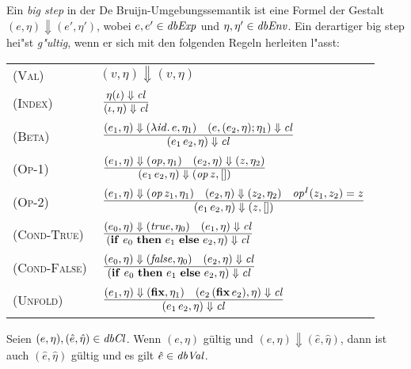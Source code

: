 \documentclass[12pt,fleqn]{article}
\newcommand{\RN}[1]{\mbox{\textsc{(#1)}}}
\newcommand{\cl}{\name{cl}}
\begin{document}
\begin{definition}
Ein {\em big step} in der De Bruijn-Umgebungssemantik ist eine Formel der Gestalt $(e,\eta) \Downarrow (e',\eta')$,
wobei $e,e'\in{\text{\it dbExp\/}}$ und $\eta,\eta'\in{\text{\it dbEnv\/}}$. Ein derartiger big step hei"st {\em g"ultig}, wenn er sich mit den
folgenden Regeln herleiten l"asst: \\[5mm]
\begin{tabular}{ll}
  \RN{Val}        & $(v,\eta) \Downarrow (v,\eta)$ \\[3mm]
  \RN{Index}      & $\regel{\eta(\iota) \Downarrow \cl}
                           {(\iota,\eta) \Downarrow \cl}$ \\[3mm]
  \RN{Beta}       & $\regel{(e_1,\eta) \Downarrow (\abstr{\id}{e},\eta_1)
                            \quad (e,(e_2,\eta);\eta_1) \Downarrow \cl}
                           {(\app{e_1}{e_2},\eta) \Downarrow \cl}$ \\[3mm]
  \RN{Op-1}       & $\regel{(e_1,\eta) \Downarrow (\op,\eta_1) \quad (e_2,\eta) \Downarrow (z,\eta_2)}
                           {(\app{e_1}{e_2},\eta) \Downarrow (\app{\op}{z},[])}$ \\[3mm]
  \RN{Op-2}       & $\regel{(e_1,\eta) \Downarrow (\app{\op}{z_1},\eta_1)
                            \quad (e_2,\eta) \Downarrow (z_2,\eta_2)
                            \quad \op^I(z_1,z_2) = z}
                           {(\app{e_1}{e_2},\eta) \Downarrow (z,[])}$ \\[3mm]
  \RN{Cond-True}  & $\regel{(e_0,\eta) \Downarrow (\true,\eta_0) \quad (e_1,\eta) \Downarrow \cl}
                           {(\bifte{e_0}{e_1}{e_2},\eta) \Downarrow \cl}$ \\[3mm]
  \RN{Cond-False} & $\regel{(e_0,\eta) \Downarrow (\false,\eta_0) \quad (e_2,\eta) \Downarrow \cl}
                           {(\bifte{e_0}{e_1}{e_2},\eta) \Downarrow \cl}$ \\[3mm]
  \RN{Unfold}     & $\regel{(e_1,\eta) \Downarrow (\bfix,\eta_1)
                            \quad (\app{e_2}{(\app{\bfix}{e_2})},\eta) \Downarrow \cl}
                           {(\app{e_1}{e_2},\eta) \Downarrow \cl}$
\end{tabular}
\end{definition}

\begin{lemma}
  Seien $(e,\eta),(\hat{e},\hat{\eta})\in{\text{\it dbCl\/}}$. Wenn $(e,\eta)$ g\"ultig und
  $(e,\eta) \Downarrow (\hat{e},\hat{\eta})$, dann ist auch $(\hat{e},\hat{\eta})$
  g\"ultig und es gilt $\hat{e}\in{\text{\it dbVal\/}}$.
\end{lemma}
\end{document}
